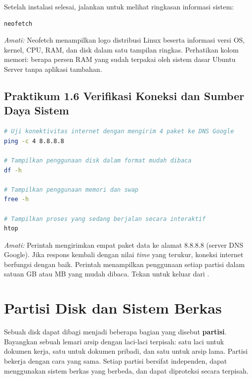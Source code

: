 Setelah instalasi selesai, jalankan  untuk melihat ringkasan informasi
sistem:

\begin{lstlisting}[language=bash, caption={Menampilkan informasi sistem}]
neofetch
\end{lstlisting}

\textit{Amati:} Neofetch menampilkan logo distribusi Linux beserta informasi versi OS,
kernel, CPU, RAM, dan disk dalam satu tampilan ringkas. Perhatikan kolom memori: berapa
persen RAM yang sudah terpakai oleh sistem dasar Ubuntu Server tanpa aplikasi tambahan.

\subsection*{Praktikum 1.6 Verifikasi Koneksi dan Sumber Daya Sistem}

\begin{lstlisting}[language=bash, caption={Pemeriksaan jaringan dan sumber daya}]
# Uji konektivitas internet dengan mengirim 4 paket ke DNS Google
ping -c 4 8.8.8.8

# Tampilkan penggunaan disk dalam format mudah dibaca
df -h

# Tampilkan penggunaan memori dan swap
free -h

# Tampilkan proses yang sedang berjalan secara interaktif
htop
\end{lstlisting}

\textit{Amati:} Perintah  mengirimkan empat paket data ke alamat 8.8.8.8
(server DNS Google). Jika respons kembali dengan nilai \textit{time} yang terukur,
koneksi internet berfungsi dengan baik. Perintah  menampilkan penggunaan
setiap partisi dalam satuan GB atau MB yang mudah dibaca. Tekan  untuk
keluar dari .

\section{Partisi Disk dan Sistem Berkas}
\label{sec:disk-partitioning}

Sebuah disk dapat dibagi menjadi beberapa bagian yang disebut \textbf{partisi}. Bayangkan
sebuah lemari arsip dengan laci-laci terpisah: satu laci untuk dokumen kerja, satu untuk
dokumen pribadi, dan satu untuk arsip lama. Partisi bekerja dengan cara yang sama. Setiap
partisi bersifat independen, dapat menggunakan sistem berkas yang berbeda, dan dapat
diproteksi secara terpisah.

